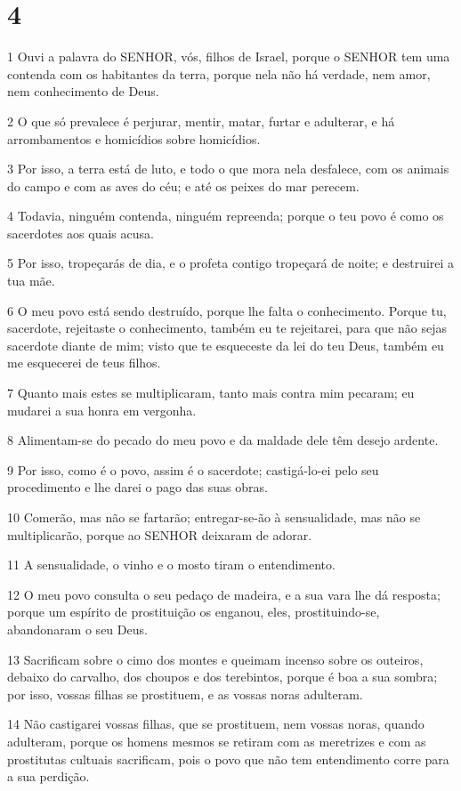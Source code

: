 \chapter{4}

\par 1 Ouvi a palavra do SENHOR, vós, filhos de Israel, porque o SENHOR tem uma contenda com os habitantes da terra, porque nela não há verdade, nem amor, nem conhecimento de Deus.
\par 2 O que só prevalece é perjurar, mentir, matar, furtar e adulterar, e há arrombamentos e homicídios sobre homicídios.
\par 3 Por isso, a terra está de luto, e todo o que mora nela desfalece, com os animais do campo e com as aves do céu; e até os peixes do mar perecem.
\par 4 Todavia, ninguém contenda, ninguém repreenda; porque o teu povo é como os sacerdotes aos quais acusa.
\par 5 Por isso, tropeçarás de dia, e o profeta contigo tropeçará de noite; e destruirei a tua mãe.
\par 6 O meu povo está sendo destruído, porque lhe falta o conhecimento. Porque tu, sacerdote, rejeitaste o conhecimento, também eu te rejeitarei, para que não sejas sacerdote diante de mim; visto que te esqueceste da lei do teu Deus, também eu me esquecerei de teus filhos.
\par 7 Quanto mais estes se multiplicaram, tanto mais contra mim pecaram; eu mudarei a sua honra em vergonha.
\par 8 Alimentam-se do pecado do meu povo e da maldade dele têm desejo ardente.
\par 9 Por isso, como é o povo, assim é o sacerdote; castigá-lo-ei pelo seu procedimento e lhe darei o pago das suas obras.
\par 10 Comerão, mas não se fartarão; entregar-se-ão à sensualidade, mas não se multiplicarão, porque ao SENHOR deixaram de adorar.
\par 11 A sensualidade, o vinho e o mosto tiram o entendimento.
\par 12 O meu povo consulta o seu pedaço de madeira, e a sua vara lhe dá resposta; porque um espírito de prostituição os enganou, eles, prostituindo-se, abandonaram o seu Deus.
\par 13 Sacrificam sobre o cimo dos montes e queimam incenso sobre os outeiros, debaixo do carvalho, dos choupos e dos terebintos, porque é boa a sua sombra; por isso, vossas filhas se prostituem, e as vossas noras adulteram.
\par 14 Não castigarei vossas filhas, que se prostituem, nem vossas noras, quando adulteram, porque os homens mesmos se retiram com as meretrizes e com as prostitutas cultuais sacrificam, pois o povo que não tem entendimento corre para a sua perdição.
